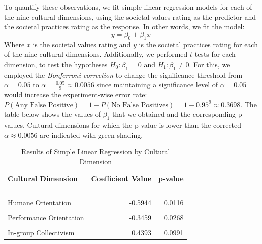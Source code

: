 \documentclass[
]{article}
\begin{document}
To quantify these observations, we fit simple linear regression models
for each of the nine cultural dimensions, using the societal values
rating as the predictor and the societal practices rating as the
response. In other words, we fit the model: \[
y = \beta_0 + \beta_1 x
\] Where \(x\) is the societal values rating and \(y\) is the societal
practices rating for each of the nine cultural dimensions. Additionally,
we performed \(t\)-tests for each dimension, to test the hypotheses
\(H_0: \beta_1 = 0\) and \(H_1: \beta_1 \ne 0\). For this, we employed
the \emph{Bonferroni correction} to change the significance threshold
from \(\alpha = 0.05\) to \(\alpha = \frac{0.05}{9} \approx 0.0056\)
since maintaining a significance level of \(\alpha = 0.05\) would
increase the experiment-wise error rate:
\(P(\text{Any False Positive}) = 1 - P(\text{No False Positives}) = 1 - 0.95^{9} \approx 0.3698\).
The table below shows the values of \(\beta_1\) that we obtained and the
corresponding p-values. Cultural dimensions for which the p-value is
lower than the corrected \(\alpha \approx 0.0056\) are indicated with
green shading.

\begin{table}[!h]

\caption{\label{tab:SPV SLR Table}Results of Simple Linear Regression by Cultural Dimension}
\centering
\begin{tabular}[t]{lrr}
\toprule
Cultural Dimension & Coefficient Value & p-value\\
\midrule
\cellcolor[HTML]{E5F5E0}{Uncertainty Avoidance} & \cellcolor[HTML]{E5F5E0}{-0.6199} & \cellcolor[HTML]{E5F5E0}{0.0000}\\
\cellcolor[HTML]{E5F5E0}{Institutional Collectivism} & \cellcolor[HTML]{E5F5E0}{-0.5251} & \cellcolor[HTML]{E5F5E0}{0.0000}\\
\cellcolor[HTML]{E5F5E0}{Power Distance} & \cellcolor[HTML]{E5F5E0}{-0.4991} & \cellcolor[HTML]{E5F5E0}{0.0006}\\
\cellcolor[HTML]{E5F5E0}{Future Orientation} & \cellcolor[HTML]{E5F5E0}{-0.4725} & \cellcolor[HTML]{E5F5E0}{0.0009}\\
Humane Orientation & -0.5944 & 0.0116\\
\addlinespace
\cellcolor[HTML]{F0F0F0}{Gender Egalitarianism} & \cellcolor[HTML]{F0F0F0}{0.2437} & \cellcolor[HTML]{F0F0F0}{0.0124}\\
Performance Orientation & -0.3459 & 0.0268\\
\cellcolor[HTML]{F0F0F0}{Assertiveness} & \cellcolor[HTML]{F0F0F0}{-0.1507} & \cellcolor[HTML]{F0F0F0}{0.0414}\\
In-group Collectivism & 0.4393 & 0.0991\\
\bottomrule
\end{tabular}
\end{table}
\end{document}
